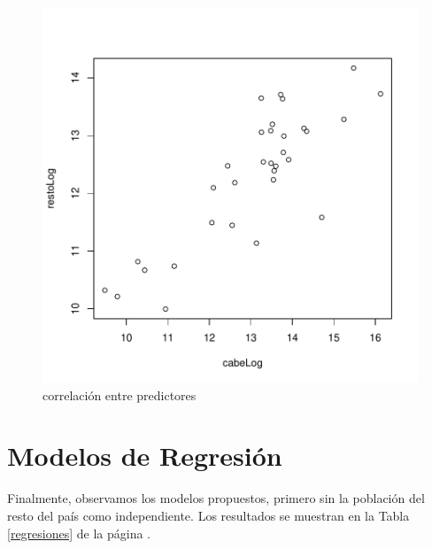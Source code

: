 \documentclass{article}
\begin{document}
\begin{figure}[h]
\centering
\begin{adjustbox}{width=7cm,height=7cm,clip,trim=0cm 0cm 0cm 0cm}
\includegraphics{Proyecto_final-corrPlot}
\end{adjustbox}
\caption{correlaci\'on entre predictores}
\label{corrPlot}
\end{figure}
\clearpage

\section{Modelos de Regresi\'on}
Finalmente, observamos los modelos propuestos, primero sin la poblaci\'on del resto del pa\'is como independiente. Los resultados se muestran en la Tabla \ref{regresiones} de la p\'agina \pageref{regresiones}.
\end{document}
